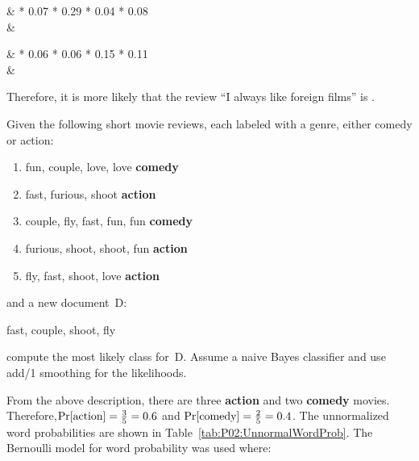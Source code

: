 \begin{aligncustom}
  \Pr{} & * 0.07 * 0.29 * 0.04 * 0.08 \\
                                       &\approx {}
\end{aligncustom}

\begin{aligncustom}
  \Pr{} & * 0.06 * 0.06 * 0.15 * 0.11 \\
                                       &\approx {}
\end{aligncustom}


\noindent
Therefore, it is more likely that the review ``I always like foreign films'' is .

\newpage
\begin{subproblem}\label{P02:B}
Given the following short movie reviews,  each labeled with a genre,  either comedy or action:

\begin{enumerate}
  \item fun, couple, love, love \hspace{6pt}\textbf{comedy}
  \item fast, furious, shoot \hspace{6pt}\textbf{action}
  \item couple, fly, fast, fun, fun \hspace{6pt}\textbf{comedy}
  \item furious, shoot, shoot, fun \hspace{6pt}\textbf{action}
  \item fly, fast, shoot, love \hspace{6pt}\textbf{action}
\end{enumerate}

\noindent
and a new document~D:

\noindent
\hspace{6pt}
fast, couple, shoot, fly

\noindent
compute the most likely class for~D. Assume a naive Bayes classifier and use add\-/1 smoothing for the likelihoods.
\end{subproblem}

From the above description, there are three \textbf{action} and two \textbf{comedy} movies.  Therefore,\linebreak ${\Pr\lbrack\text{action}\rbrack=\frac{3}{5}=0.6}$ and ${\Pr\lbrack\text{comedy}\rbrack=\frac{2}{5}=0.4}$.  The unnormalized word probabilities are shown in Table~\ref{tab:P02:UnnormalWordProb}.  The Bernoulli model for word probability was used where:

